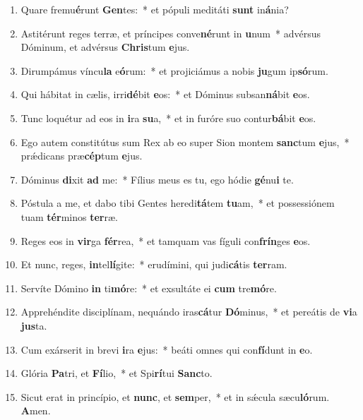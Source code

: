 \documentclass[twoside]{article}
\begin{document}
\begin{paracol}[1]{2}
\begin{enumerate}[wide, itemsep=0mm, labelwidth=!, labelindent=0pt, label=\color{gregoriocolor}\theenumi]
\item Quare fremu\textbf{é}runt \textbf{Gen}tes:~* et pópuli meditáti \textbf{sunt} in\textbf{á}nia?
\item Astitérunt reges terræ, et príncipes conve\textbf{né}runt in \textbf{u}num~* advérsus Dóminum, et advérsus \textbf{Chris}tum \textbf{e}jus.
\item Dirumpámus víncu\textbf{la} e\textbf{ó}rum:~* et projiciámus a nobis \textbf{ju}gum ip\textbf{só}rum.
\item Qui hábitat in cælis, irri\textbf{dé}bit \textbf{e}os:~* et Dóminus subsan\textbf{ná}bit \textbf{e}os.
\item Tunc loquétur ad eos in \textbf{i}ra \textbf{su}a,~* et in furóre suo contur\textbf{bá}bit \textbf{e}os.
\item Ego autem constitútus sum Rex ab eo super Sion montem \textbf{sanc}tum \textbf{e}jus,~* prǽdicans præ\textbf{cép}tum \textbf{e}jus.
\item Dóminus \textbf{di}xit \textbf{ad} me:~* Fílius meus es tu, ego hódie \textbf{gé}nu\textbf{i} te.
\item Póstula a me, et dabo tibi Gentes heredi\textbf{tá}tem \textbf{tu}am,~* et possessiónem tuam \textbf{tér}minos \textbf{ter}ræ.
\item Reges eos in \textbf{vir}ga \textbf{fér}rea,~* et tamquam vas fíguli con\textbf{frín}ges \textbf{e}os.
\item Et nunc, reges, \textbf{in}tel\textbf{lí}gite:~* erudímini, qui judi\textbf{cá}tis \textbf{ter}ram.
\item Servíte Dómino \textbf{in} ti\textbf{mó}re:~* et exsultáte ei \textbf{cum} tre\textbf{mó}re.
\item Apprehéndite disciplínam, nequándo iras\textbf{cá}tur \textbf{Dó}minus,~* et pereátis de \textbf{vi}a \textbf{jus}ta.
\item Cum exárserit in brevi \textbf{i}ra \textbf{e}jus:~* beáti omnes qui con\textbf{fí}dunt in \textbf{e}o.
\item Glória \textbf{Pa}tri, et \textbf{Fí}lio,~* et Spi\textbf{rí}tui \textbf{Sanc}to.
\item Sicut erat in princípio, et \textbf{nunc}, et \textbf{sem}per,~* et in sǽcula sæcu\textbf{ló}rum. \textbf{A}men.
\end{enumerate}

\switchcolumn


\end{paracol}
\end{document}
